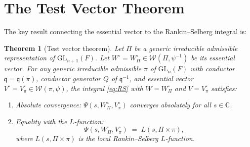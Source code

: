 \documentclass[12pt]{article}
\newtheorem{theorem}{Theorem}
\theoremstyle{definition}
\theoremstyle{remark}
\begin{document}
\section{The Test Vector Theorem}

The key result connecting the essential vector to the Rankin--Selberg integral is:

\begin{theorem}[Test vector theorem]\label{thm:tv}
Let $\Pi$ be a generic irreducible admissible representation of
$\mathrm{GL}_{n+1}(F)$.  Let $W^\circ = W^\circ_\Pi\in\mathcal{W}(\Pi,\psi^{-1})$
be its essential vector.  For any generic irreducible admissible $\pi$ of
$\mathrm{GL}_n(F)$ with conductor $\mathfrak{q}=\mathfrak{q}(\pi)$, conductor
generator $Q$ of $\mathfrak{q}^{-1}$, and essential vector
$V^\circ=V^\circ_\pi\in\mathcal{W}(\pi,\psi)$, the integral
\eqref{eq:RS} with $W=W^\circ_\Pi$ and $V=V^\circ_\pi$ satisfies:
\begin{enumerate}
  \item[\rm(i)] \textit{Absolute convergence}: $\Psi(s,W^\circ_\Pi,V^\circ_\pi)$
    converges absolutely for all $s\in\mathbb{C}$.
  \item[\rm(ii)] \textit{Equality with the $L$-function}:
    \begin{equation}\label{eq:tv}
      \Psi(s,W^\circ_\Pi,V^\circ_\pi) \;=\; L(s,\Pi\times\pi),
    \end{equation}
    where $L(s,\Pi\times\pi)$ is the local Rankin--Selberg $L$-function.
\end{enumerate}
\end{theorem}
\end{document}
